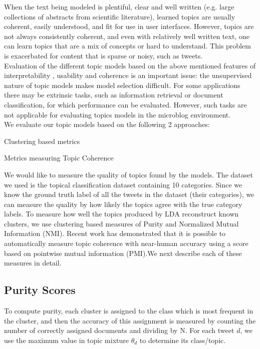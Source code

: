 \documentclass[10pt,a5paper,twoside]{article}
\begin{document}
When the text being modeled is plentiful, clear and well written (e.g. large
collections of abstracts from scientific literature), learned topics are usually coherent, easily understood, and fit for use in user interfaces. However, topics are not always consistently coherent, and even with relatively well written text, one can learn topics that are a mix of concepts or hard to understand. This problem is exacerbated for content that is sparse or noisy, such as tweets.
\\
Evaluation of the different topic models based on the above mentioned features of interpretability , usability and coherence is an important issue: the unsupervised nature of topic models makes model selection difficult. For some applications there may be extrinsic tasks, such as information retrieval or document classification, for which performance can be evaluated. However, such tasks are not applicable for evaluating topics models in the microblog environment. 
\\
We evaluate our topic models based on the following 2 approaches:
\begin{compactenum}
\item Clustering based metrics
\item Metrics measuring Topic Coherence
\end{compactenum}

We would like to measure the quality of topics found by the models. The dataset we used is the topical classification dataset containing 10 categories. Since we know the ground truth label of all the tweets in the dataset (their categories), we can measure the quality by how likely the topics agree with the true category labels. To measure how well the topics produced by LDA reconstruct known clusters, we use clustering based measures of Purity and Normalized Mutual Information (NMI). Recent work has demonstrated that it is possible to automatically measure topic coherence with near-human accuracy using a score based on pointwise mutual information (PMI).We next describe each of these measures in detail.


\subsection{Purity Scores}
To compute purity, each cluster is assigned to the class which is most frequent in the cluster, and then the accuracy of this assignment is measured by counting the number of correctly assigned documents and dividing by N. For each tweet $d$, we use the maximum value in topic mixture $\theta_{d} $ to determine its class/topic.
\end{document}
